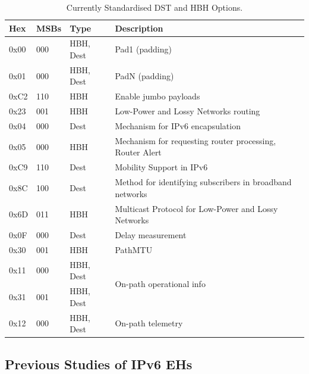 \documentclass[conference]{IEEEtran}
\begin{document}

\begin{table}[b]
\center
\caption{Currently Standardised DST and HBH Options.}
\begin{tabular}{p{}|p{}|l|p{}}
Hex  & MSBs & Type      & Description                                              \\
\hline
\hline
0x00 & 000  & HBH, Dest & Pad1 (padding)                                           \\
0x01 & 000  & HBH, Dest & PadN (padding)                                           \\
0xC2 & 110  & HBH       & Enable jumbo payloads                                    \\
0x23 & 001  & HBH       & Low-Power and Lossy Networks routing                     \\
0x04 & 000  & Dest      & Mechanism for IPv6 encapsulation                 \\
0x05 & 000  & HBH       & Mechanism for requesting router processing, Router Alert              \\
0xC9 & 110  & Dest      & Mobility Support in IPv6                                 \\
0x8C & 100  & Dest      & Method for identifying subscribers in broadband networks \\
0x6D & 011  & HBH       & Multicast Protocol for Low-Power and  Lossy Networks     \\
0x0F & 000  & Dest      & Delay measurement                                        \\
0x30 & 001  & HBH       & PathMTU                                     \\
0x11 & 000  & HBH, Dest & \multirow{2}{*}{On-path operational info}                \\
0x31 & 001  & HBH, Dest &                                                          \\
0x12 & 000  & HBH, Dest & On-path telemetry                                       
\end{tabular}
  \label{tbl:options}
\end{table}


\subsection{Previous Studies of IPv6 EHs}
\end{document}
